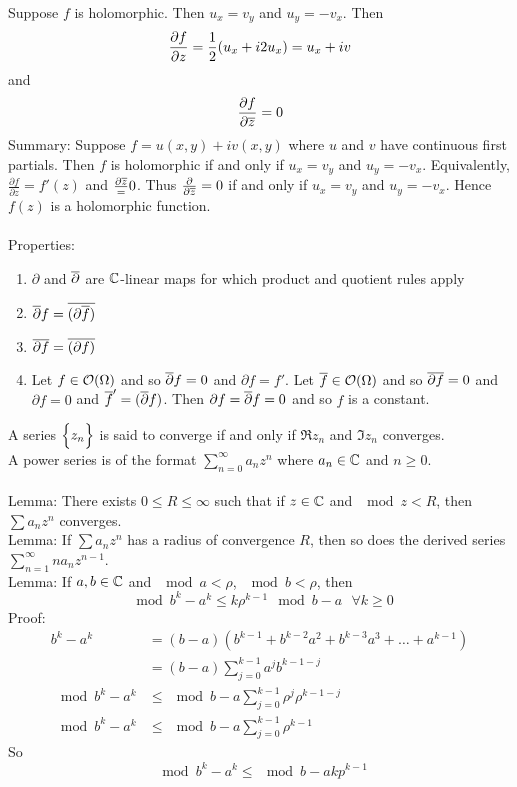 \documentclass[12pt]{article}
\begin{document}
Suppose $f$ is holomorphic. Then $u_x = v_y$ and $u_y = -v_x$. Then 
$$\frac{\partial f}{\partial z} = \frac{1}{2} (u_x + i2u_x) = u_x + iv$$ and $$ \frac{\partial f}{\partial \overline{z}} = 0 $$ 
Summary: Suppose $f = u(x,y) + iv(x,y)$ where $u$ and $v$ have continuous first partials. Then $f$ is holomorphic if and only if $u_x = v_y$ and $u_y = -v_x$. Equivalently, $\frac{\partial f}{\partial z} = f'(z)$ and $\frac{\partial \overline{z}} = 0$. Thus $\frac{\partial}{\partial \overline{z}} = 0$ if and only if $u_x = v_y$ and $u_y = -v_x$. Hence $f(z)$ is a holomorphic function. \\~\\
Properties: \begin{enumerate} 
\item $\partial$ and $\overline{\partial}$ are $\mathbb{C}$-linear maps for which product and quotient rules apply 
\item $\overline{\partial} f = \overline{(\partial \overline{f})}$ 
\item $\overline{\partial} \overline{f} = \overline{(\partial f)}$ 
\item Let $f \in \mathcal{O}(\Omega)$ and so $\overline{\partial} f = 0$ and $\partial f = f'$. Let $\overline{f} \in \mathcal{O}(\Omega)$ and so $\overline{\partial} \overline{f} = 0$ and $\partial f = 0$ and $\overline{f}' = (\overline{\partial} f)$. Then $\partial f = \overline{\partial} f = 0$ and so $f$ is a constant. \end{enumerate} 
A series $\Big\{ z_n \Big\}$ is said to converge if and only if $\Re{z_n}$ and $\Im{z_n}$ converges. \\
A power series is of the format $\sum_{n=0}^\infty a_nz^n$ where $a_n \in \mathbb{C}$ and $n \geq 0$. \\~\\
Lemma: There exists $0 \leq R \leq \infty$ such that if $z \in \mathbb{C}$ and $\mod{z} < R$, then $\sum a_nz^n$ converges. \\
Lemma: If $\sum a_nz^n$ has a radius of convergence $R$, then so does the derived series $\sum_{n=1}^\infty na_nz^{n-1}$. \\
Lemma: If $a,b \in \mathbb{C}$ and $\mod{a} < \rho$, $\mod{b} < \rho$, then $$ \mod{b^k - a^k} \leq k\rho^{k-1}\mod{b-a} ~~~\forall k \geq 0 $$ 
Proof: $$ \begin{aligned} b^k - a^k &= (b-a)(b^{k-1} + b^{k-2}a^2 + b^{k-3}a^3 + \dots + a^{k-1}) \\ &= (b-a)\sum_{j=0}^{k-1} a^jb^{k-1-j} \\ \mod{b^k - a^k} &\leq \mod{b-a}\sum_{j=0}^{k-1} \rho^j \rho^{k-1-j} \\ \mod{b^k - a^k} &\leq \mod{b-a}\sum_{j=0}^{k-1} \rho^{k-1} \end{aligned} $$ So $$\mod{b^k - a^k} \leq \mod{b-a}kp^{k-1} $$ 
\end{document}
